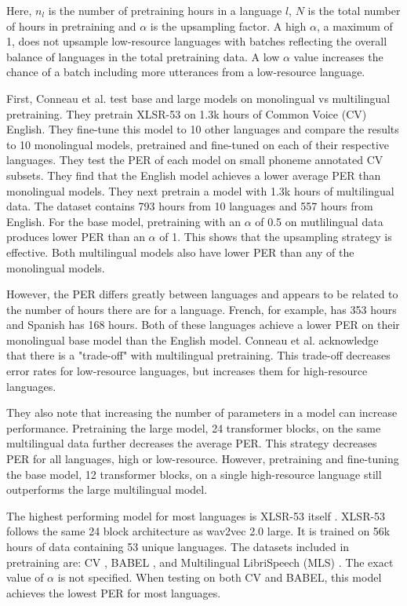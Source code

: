 Here, $n_l$ is the number of pretraining hours in a language $l$, $N$ is the total number of hours in pretraining and $\alpha$ is the upsampling factor. A high $\alpha$, a maximum of 1, does not upsample low-resource languages with batches reflecting the overall balance of languages in the total pretraining data. A low $\alpha$ value increases the chance of a batch including more utterances from a low-resource language. 

First, Conneau et al. \cite{XLSR-53} test base and large models on monolingual vs multilingual pretraining. They pretrain XLSR-53 on 1.3k hours of Common Voice (CV) \cite{ardila-etal-2020-common} English. They fine-tune this model to 10 other languages and compare the results to 10 monolingual models, pretrained and fine-tuned on each of their respective languages. They test the PER of each model on small phoneme annotated CV subsets. They find that the English model achieves a lower average PER than monolingual models. They next pretrain a model with 1.3k hours of multilingual data. The dataset contains 793 hours from 10 languages and 557 hours from English. For the base model, pretraining with an $\alpha$ of 0.5 on mutlilingual data produces lower PER than an $\alpha$ of 1. This shows that the upsampling strategy is effective. Both multilingual models also have lower PER than any of the monolingual models.

However, the PER differs greatly between languages and appears to be related to the number of hours there are for a language. French, for example, has 353 hours and Spanish has 168 hours. Both of these languages achieve a lower PER on their monolingual base model than the English model. Conneau et al. \cite{XLSR-53} acknowledge that there is a "trade-off" with multilingual pretraining. This trade-off decreases error rates for low-resource languages, but increases them for high-resource languages. 

They also note that increasing the number of parameters in a model can increase performance. Pretraining the large model, 24 transformer blocks, on the same multilingual data further decreases the average PER. This strategy decreases PER for all languages, high or low-resource. However, pretraining and fine-tuning the base model, 12 transformer blocks, on a single high-resource language still outperforms the large multilingual model. 

The highest performing model for most languages is XLSR-53 itself \cite{XLSR-53}. XLSR-53 follows the same 24 block architecture as wav2vec 2.0 large. It is trained on 56k hours of data containing 53 unique languages. The datasets included in pretraining are: CV \cite{ardila-etal-2020-common}, BABEL \cite{gales2014speech}, and Multilingual LibriSpeech (MLS) \cite{MLS}. The exact value of $\alpha$ is not specified. When testing on both CV and BABEL, this model achieves the lowest PER for most languages.

